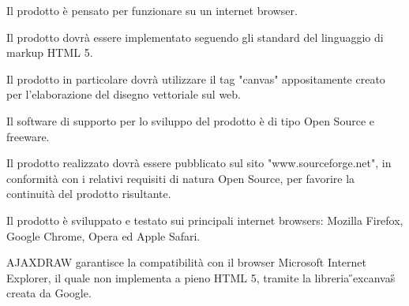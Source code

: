 \begin{elenconumerato}{\subsubsecindent}
\item Il prodotto \`e pensato per funzionare su un internet browser.
\item Il prodotto dovr\` a essere implementato seguendo gli standard del linguaggio di markup HTML 5.
\item Il prodotto in particolare dovr\` a utilizzare il tag "canvas" appositamente creato per l'elaborazione del disegno vettoriale sul web.
\item Il software di supporto per lo sviluppo del prodotto \`e di tipo Open Source e freeware.
\item Il prodotto realizzato dovr\`a essere pubblicato sul sito "www.sourceforge.net", in conformit\` a con i relativi requisiti di natura Open Source, per favorire la continuit\` a del prodotto risultante.
\item Il prodotto \`e sviluppato e testato sui principali internet browsers: Mozilla Firefox, Google Chrome, Opera ed Apple Safari.
\end{elenconumerato}
\begin{elenconumerato}{\subsubsecindent}
\item{AJAXDRAW garantisce la compatibilit\` a con il browser Microsoft Internet Explorer, il quale non implementa a pieno HTML 5, tramite la libreria \H{}excanvas\H{} creata da Google.}
\end{elenconumerato}


\newpage
